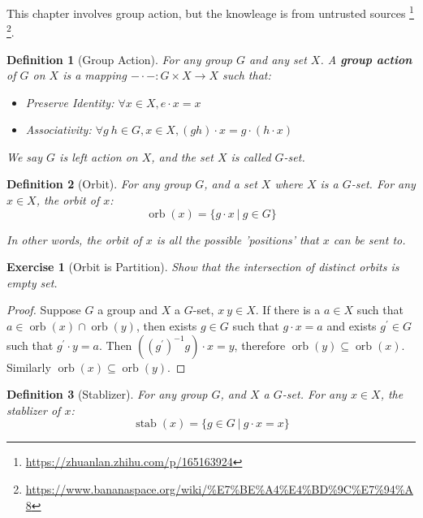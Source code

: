 \documentclass[14pt]{extarticle}
\newtheorem{exercise}{Exercise}[section]
\newtheorem{definition}{Definition}[section]
\DeclareMathOperator{\orb}{orb}
\DeclareMathOperator{\stab}{stab}
\newcommand{\inv}[1]{#1^{-1}}
\newcommand{\1}{\{e\}}
\begin{document}
This chapter involves group action, but the knowleage is from untrusted sources
\footnote[0]{\url{https://zhuanlan.zhihu.com/p/165163924}}
\footnote[1]{\url{https://www.bananaspace.org/wiki/\%E7\%BE\%A4\%E4\%BD\%9C\%E7\%94\%A8}}.

\begin{definition}[Group Action]
  For any group $G$ and any set $X$.
  A \textbf{group action} of $G$ on $X$ is a mapping $-\cdot- : G \times X \rightarrow X$
  such that:
  \begin{itemize}
    \item Preserve Identity: $\forall x \in X, e \cdot x = x$
    \item Associativity: $\forall g \ h \in G, x \in X, (gh) \cdot x = g \cdot (h \cdot x)$
  \end{itemize}

  We say $G$ is left action on $X$, and the set $X$ is called $G$-set.
\end{definition}

\begin{definition}[Orbit]
  For any group $G$, and a set $X$ where $X$ is a $G$-set.
  For any $x \in X$, the orbit of $x$:
  \[
    \orb(x) = \{ g \cdot x \ | \ g \in G \}
  \]

  In other words, the orbit of $x$ is all the possible 'positions' that $x$ can be sent to.
\end{definition}

\setcounter{section}{7}
\setcounter{exercise}{66}
\begin{exercise}[Orbit is Partition]
  Show that the intersection of distinct orbits is empty set.
\end{exercise}
\begin{proof}
  Suppose $G$ a group and $X$ a $G$-set, $x \ y \in X$.
  If there is a $a \in X$ such that $a \in \orb(x) \cap \orb(y)$,
  then exists $g \in G$ such that $g \cdot x = a$
  and exists $g^\prime \in G$ such that $g^\prime \cdot y = a$.
  Then $(\inv{(g^\prime)} g) \cdot x = y$, therefore $\orb(y) \subseteq \orb(x)$.
  Similarly $\orb(x) \subseteq \orb(y)$.
\end{proof}
\setcounter{section}{-1}

\begin{definition}[Stablizer]
  For any group $G$, and $X$ a $G$-set.
  For any $x \in X$, the stablizer of $x$:
  \[
    \stab(x) = \{ g \in G \ | \ g \cdot x = x \}
  \]
\end{definition}
\end{document}
